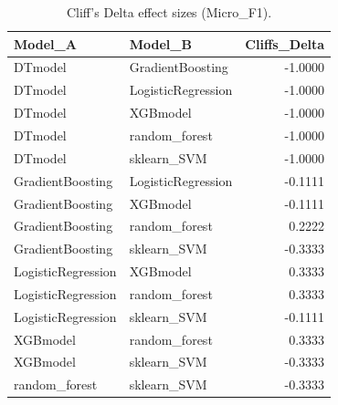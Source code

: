 \begin{table}[t]
\centering
\begin{tabular}{llr}
\toprule
Model_A & Model_B & Cliffs_Delta \\
\midrule
DTmodel & GradientBoosting & -1.0000 \\
DTmodel & LogisticRegression & -1.0000 \\
DTmodel & XGBmodel & -1.0000 \\
DTmodel & random_forest & -1.0000 \\
DTmodel & sklearn_SVM & -1.0000 \\
GradientBoosting & LogisticRegression & -0.1111 \\
GradientBoosting & XGBmodel & -0.1111 \\
GradientBoosting & random_forest & 0.2222 \\
GradientBoosting & sklearn_SVM & -0.3333 \\
LogisticRegression & XGBmodel & 0.3333 \\
LogisticRegression & random_forest & 0.3333 \\
LogisticRegression & sklearn_SVM & -0.1111 \\
XGBmodel & random_forest & 0.3333 \\
XGBmodel & sklearn_SVM & -0.3333 \\
random_forest & sklearn_SVM & -0.3333 \\
\bottomrule
\end{tabular}
\caption{Cliff's Delta effect sizes (Micro_F1).}
\label{tab:cliffs_Micro_F1}
\end{table}